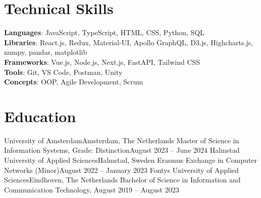 \section{Technical Skills}
 \begin{itemize}[leftmargin=0.15in, label={}]
  \small{\item{
    \textbf{Languages}{: JavaScript, TypeScript, HTML, CSS, Python, SQL} \\
    \textbf{Libraries}{: React.js, Redux, Material-UI, Apollo GraphQL, D3.js, Highcharts.js, numpy, pandas, matplotlib} \\
    \textbf{Frameworks}{: Vue.js, Node.js, Next.js, FastAPI, Tailwind CSS} \\
    \textbf{Tools}{: Git, VS Code, Postman, Unity} \\
    \textbf{Concepts}{: OOP, Agile Development, Scrum} \\
  }}
 \end{itemize}

\section{Education}
\resumeSubHeadingListStart
  \resumeSubheading
    {University of Amsterdam}{Amsterdam, The Netherlands}
    {Master of Science in Information Systems, Grade: Distinction}{August 2023 – June 2024}
    \resumeItemListStart
    \resumeItemListEnd
  \resumeSubheading
    {Halmstad University of Applied Sciences}{Halmstad, Sweden}
    {Erasmus Exchange in Computer Networks (Minor)}{August 2022 – January 2023}
    \resumeItemListStart
    \resumeItemListEnd
  \resumeSubheading
    {Fontys University of Applied Sciences}{Eindhoven, The Netherlands}
    {Bachelor of Science in Information and Communication Technology, }{August 2019 – August 2023}
    \resumeItemListStart
    \resumeItemListEnd
\resumeSubHeadingListEnd


